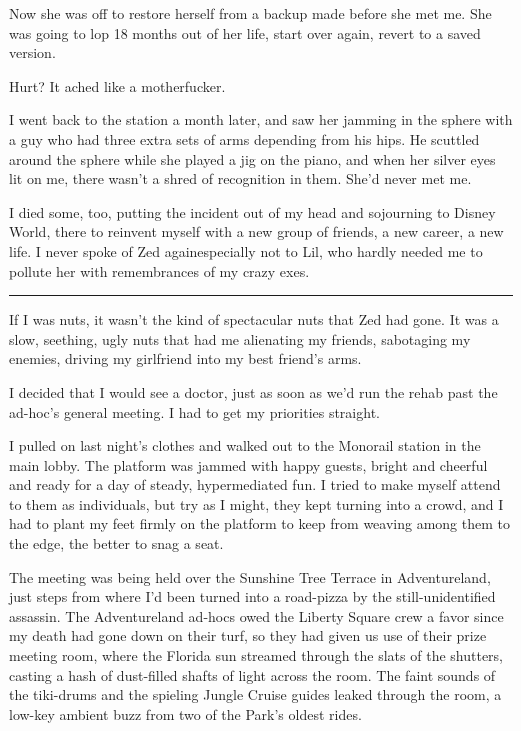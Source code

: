 Now she was off to restore herself from a backup made before she
met me. She was going to lop 18 months out of her life, start over
again, revert to a saved version.

Hurt? It ached like a motherfucker.

I went back to the station a month later, and saw her jamming in
the sphere with a guy who had three extra sets of arms depending
from his hips. He scuttled around the sphere while she played a jig
on the piano, and when her silver eyes lit on me, there wasn't a
shred of recognition in them. She'd never met me.

I died some, too, putting the incident out of my head and
sojourning to Disney World, there to reinvent myself with a new
group of friends, a new career, a new life. I never spoke of Zed
again{\dash}especially not to Lil, who hardly needed me to pollute her
with remembrances of my crazy exes.

\begin{center}\rule{3in}{0.4pt}\end{center}

If I was nuts, it wasn't the kind of spectacular nuts that Zed had
gone. It was a slow, seething, ugly nuts that had me alienating my
friends, sabotaging my enemies, driving my girlfriend into my best
friend's arms.

I decided that I would see a doctor, just as soon as we'd run the
rehab past the ad-hoc's general meeting. I had to get my priorities
straight.

I pulled on last night's clothes and walked out to the Monorail
station in the main lobby. The platform was jammed with happy
guests, bright and cheerful and ready for a day of steady,
hypermediated fun. I tried to make myself attend to them as
individuals, but try as I might, they kept turning into a crowd,
and I had to plant my feet firmly on the platform to keep from
weaving among them to the edge, the better to snag a seat.

The meeting was being held over the Sunshine Tree Terrace in
Adventureland, just steps from where I'd been turned into a
road-pizza by the still-unidentified assassin. The Adventureland
ad-hocs owed the Liberty Square crew a favor since my death had
gone down on their turf, so they had given us use of their prize
meeting room, where the Florida sun streamed through the slats of
the shutters, casting a hash of dust-filled shafts of light across
the room. The faint sounds of the tiki-drums and the spieling
Jungle Cruise guides leaked through the room, a low-key ambient
buzz from two of the Park's oldest rides.


